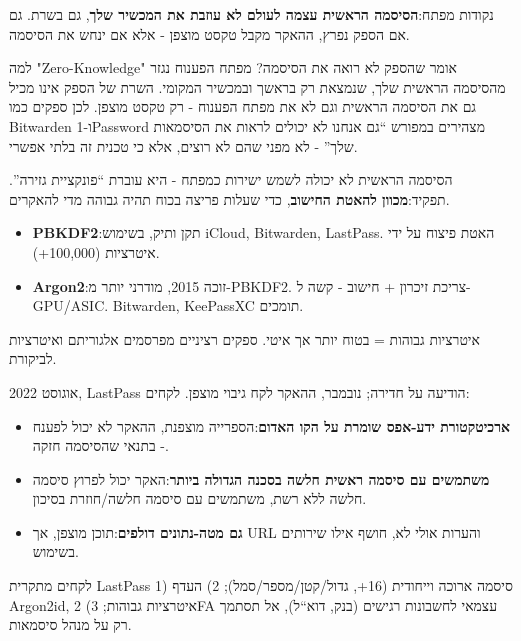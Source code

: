 נקודות מפתח:\textbf{הסיסמה הראשית עצמה לעולם לא עוזבת את המכשיר שלך}, גם בשרת. גם אם הספק נפרץ, ההאקר מקבל טקסט מוצפן - אלא אם ינחש את הסיסמה.

\begin{tcbinfo}{למה "Zero-Knowledge" אומר שהספק לא רואה את הסיסמה?}
מפתח הפענוח נגזר מהסיסמה הראשית שלך, שנמצאת רק בראשך ובמכשיר המקומי. השרת של הספק אינו מכיל גם את הסיסמה הראשית וגם לא את מפתח הפענוח - רק טקסט מוצפן. לכן ספקים כמו Bitwarden ו-1Password מצהירים במפורש “גם אנחנו לא יכולים לראות את הסיסמאות שלך” - לא מפני שהם לא רוצים, אלא כי טכנית זה בלתי אפשרי.

\end{tcbinfo}


הסיסמה הראשית לא יכולה לשמש ישירות כמפתח - היא עוברת “פונקציית גזירה”. תפקיד:\textbf{מכוון להאטת החישוב}, כדי שעלות פריצה בכוח תהיה גבוהה מדי להאקרים.

\begin{itemize}
  \item \textbf{PBKDF2}:תקן ותיק, בשימוש iCloud, Bitwarden, LastPass. האטת פיצוח על ידי איטרציות (100,000+).
  \item \textbf{Argon2}:זוכה 2015, מודרני יותר מ-PBKDF2. צריכת זיכרון + חישוב - קשה ל-GPU/ASIC. Bitwarden, KeePassXC תומכים.
\end{itemize}

איטרציות גבוהות = בטוח יותר אך איטי. ספקים רציניים מפרסמים אלגוריתם ואיטרציות לביקורת.


אוגוסט 2022, LastPass הודיעה על חדירה; נובמבר, ההאקר לקח גיבוי מוצפן. לקחים:

\begin{itemize}
  \item \textbf{ארכיטקטורת ידע-אפס שומרת על הקו האדום}:הספרייה מוצפנת, ההאקר לא יכול לפענח - בתנאי שהסיסמה חזקה.
  \item \textbf{משתמשים עם סיסמה ראשית חלשה בסכנה הגדולה ביותר}:האקר יכול לפרוץ סיסמה חלשה ללא רשת, משתמשים עם סיסמה חלשה/חוזרת בסיכון.
  \item \textbf{גם מטה-נתונים דולפים}:תוכן מוצפן, אך URL והערות אולי לא, חושף אילו שירותים בשימוש.
\end{itemize}

\begin{tcbwarn}{לקחים מתקרית LastPass}
1) סיסמה ארוכה וייחודית (16+, גדול/קטן/מספר/סמל); 2) העדף Argon2id, איטרציות גבוהות; 3) 2FA עצמאי לחשבונות רגישים (בנק, דוא“ל), אל תסתמך רק על מנהל סיסמאות.

\end{tcbwarn}


